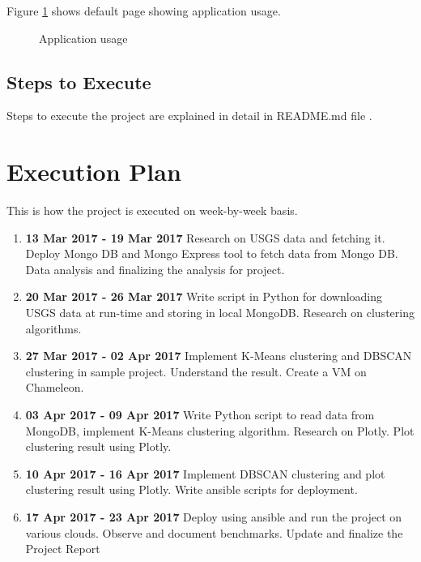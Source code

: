\documentclass[9pt,twocolumn,twoside]{../../styles/osajnl}
\begin{document}
Figure \ref{fig:figure1} shows default page showing application usage.

\begin{figure}[htbp]
\centering
{}
\caption{Application usage} 
\label{fig:figure1}
\end{figure}

\subsection{Steps to Execute}

Steps to execute the project are explained in detail in README.md file \cite{readme-001}.

\section{Execution Plan}

This is how the project is executed on week-by-week basis. 

\begin{enumerate}

\item {\bfseries 13 Mar 2017 - 19 Mar 2017} Research on USGS data and fetching it. Deploy Mongo DB and Mongo Express tool to fetch data from Mongo DB. Data analysis and finalizing the analysis for project.

\item {\bfseries 20 Mar 2017 - 26 Mar 2017} Write script in Python for downloading USGS data at run-time and storing in local MongoDB. Research on clustering algorithms. 

\item {\bfseries 27 Mar 2017 - 02 Apr 2017} Implement K-Means clustering and DBSCAN clustering in sample project. Understand the result. Create a VM on Chameleon. 

\item {\bfseries 03 Apr 2017 - 09 Apr 2017} Write Python script to read data from MongoDB, implement K-Means clustering algorithm. Research on Plotly. Plot clustering result using Plotly. 

\item {\bfseries 10 Apr 2017 - 16 Apr 2017} Implement DBSCAN clustering and plot clustering result using Plotly. Write ansible scripts for deployment.

\item {\bfseries 17 Apr 2017 - 23 Apr 2017} Deploy using ansible and run the project on various clouds. Observe and document benchmarks. Update and finalize the Project Report
\end{enumerate}
\end{document}
